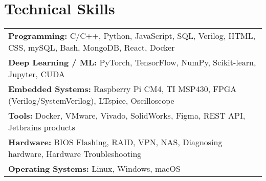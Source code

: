 \documentclass[letterpaper,11pt]{article}
\begin{document}
\section*{Technical Skills}
\begin{tabularx}{\textwidth}{X}
\textbf{Programming:} C/C++, Python, JavaScript, SQL, Verilog, HTML, CSS, mySQL, Bash, MongoDB, React, Docker\\
\textbf{Deep Learning / ML:} PyTorch, TensorFlow, NumPy, Scikit-learn, Jupyter, CUDA \\
\textbf{Embedded Systems:} Raspberry Pi CM4, TI MSP430, FPGA (Verilog/SystemVerilog), LTspice, Oscilloscope\\
\textbf{Tools:} Docker, VMware, Vivado, SolidWorks, Figma, REST API, Jetbrains products\\ 
\textbf{Hardware:} BIOS Flashing, RAID, VPN, NAS, Diagnosing hardware, Hardware Troubleshooting \\
\textbf{Operating Systems:} Linux, Windows, macOS \\
\end{tabularx}
\end{document}
